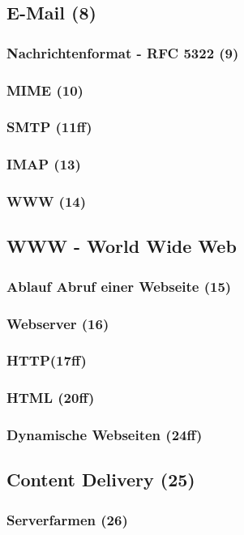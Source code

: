 \subsection{E-Mail (8)}
\subsubsection{Nachrichtenformat - RFC 5322 (9)}
\subsubsection{MIME (10)}
\subsubsection{SMTP (11ff)}
\subsubsection{IMAP (13)}
\subsubsection{WWW (14)}
\subsection{WWW - World Wide Web}
\subsubsection{Ablauf Abruf einer Webseite (15)}
\subsubsection{Webserver (16)}
\subsubsection{HTTP(17ff)}
\subsubsection{HTML (20ff)}
\subsubsection{Dynamische Webseiten (24ff)}
\subsection{Content Delivery (25)}
\subsubsection{Serverfarmen (26)}
